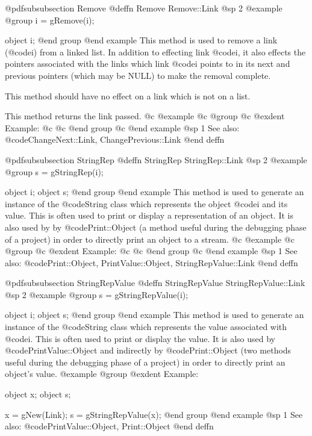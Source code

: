 @pdfsubsubsection {Remove}
@deffn {Remove} Remove::Link
@sp 2
@example
@group
i = gRemove(i);

object  i;
@end group
@end example
This method is used to remove a link (@code{i}) from a linked list.  In
addition to effecting link @code{i}, it also effects the pointers
associated with the links which link @code{i} points to in its next and
previous pointers (which may be NULL) to make the removal complete.

This method should have no effect on a link which is not on a list.

This method returns the link passed.
@c @example
@c @group
@c @exdent Example:
@c 
@c @end group
@c @end example
@sp 1
See also:  @code{ChangeNext::Link, ChangePrevious::Link}
@end deffn








@pdfsubsubsection {StringRep}
@deffn {StringRep} StringRep::Link
@sp 2
@example
@group
s = gStringRep(i);

object  i;
object  s;
@end group
@end example
This method is used to generate an instance of the @code{String} class
which represents the object @code{i} and its value.  This is often used
to print or display a representation of an object.  It is also used by
by @code{Print::Object} (a method useful during the debugging phase of
a project) in order to directly print an object to a stream.
@c @example
@c @group
@c @exdent Example:
@c 
@c @end group
@c @end example
@sp 1
See also:  @code{Print::Object, PrintValue::Object, StringRepValue::Link}
@end deffn











@pdfsubsubsection {StringRepValue}
@deffn {StringRepValue} StringRepValue::Link
@sp 2
@example
@group
s = gStringRepValue(i);

object  i;
object  s;
@end group
@end example
This method is used to generate an instance of the @code{String} class
which represents the value associated with @code{i}.  This is often
used to print or display the value.  It is also used by
@code{PrintValue::Object} and indirectly by @code{Print::Object}
(two methods useful during the debugging phase of a project)
in order to directly print an object's value.
@example
@group
@exdent Example:

object  x;
object  s;

x = gNew(Link);
s = gStringRepValue(x);
@end group
@end example
@sp 1
See also:  @code{PrintValue::Object, Print::Object}
@end deffn












